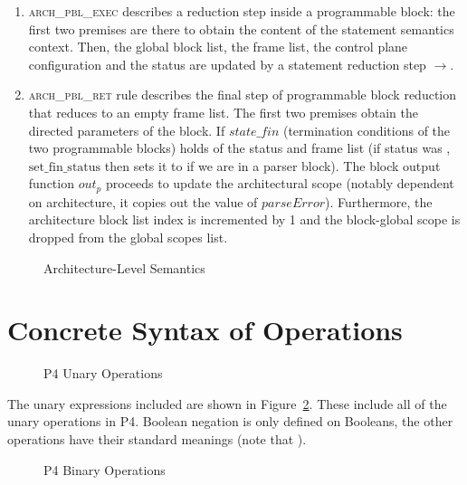 \documentclass[UTF8]{article}
\begin{document}
\begin{enumerate}
\item \textsc{arch\_pbl\_exec} describes a reduction step inside a programmable block: the first two premises are there to obtain the content of the statement semantics context. Then, the global block list, the frame list, the control plane configuration and the status are updated by a statement reduction step $\longrightarrow$.

\item \textsc{arch\_pbl\_ret} rule describes the final step of programmable block reduction that reduces to an empty frame list. The first two premises obtain the directed parameters of the block. If $\mathit{state\_fin}$ (termination conditions of the two programmable blocks) holds of the status and frame list (if status was \running{}, $\mathrm{set\_fin\_status}$ then sets it to  if we are in a parser block). The block output function $\mathit{out}_{ \mathit{p} }$ proceeds to update the architectural scope (notably dependent on architecture, it copies out the value of $\mathit{parseError}$). Furthermore, the architecture block list index is incremented by 1 and the block-global scope is dropped from the global scopes list.
\end{enumerate}

\begin{figure}[ht!]
\resizebox{.8\linewidth}{!}{
\begin{minipage}{\linewidth}
\ottdefnsarchXXsem
\end{minipage}
}
\caption{Architecture-Level Semantics}
\label{fig:semarch}
\end{figure}


\clearpage
\appendix
\section{Concrete Syntax of Operations}
\label{app:op}
\begin{figure}[ht!]
\centering\ottgrammartabular{
\ottunop\ottafterlastrule
}
\caption{P4 Unary Operations}
\label{fig:unop}
\end{figure}

The unary expressions included are shown in Figure~\ref{fig:unop}. These include all of the unary operations in P4. Boolean negation is only defined on Booleans, the other operations have their standard meanings (note that ).

\newpage
\begin{figure}[ht!]
\centering\ottgrammartabular{
\ottbinop\ottafterlastrule
}
\caption{P4 Binary Operations}
\label{fig:binop}
\end{figure}
\end{document}
